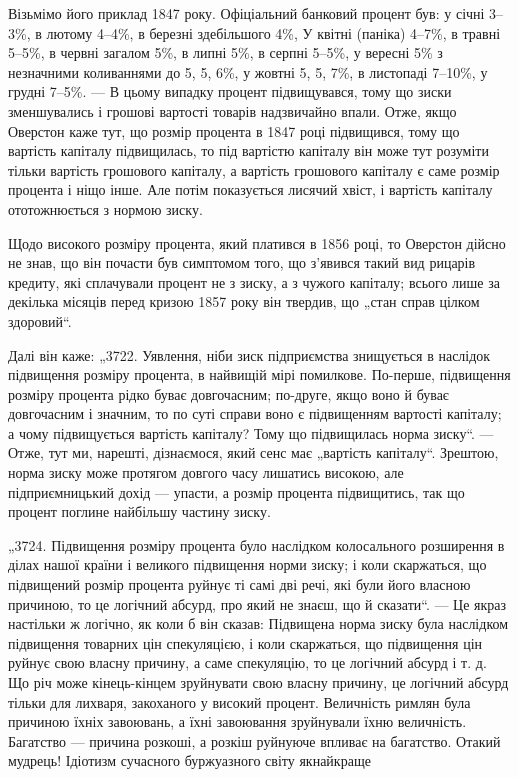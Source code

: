 Візьмімо його приклад 1847 року. Офіціальний банковий процент був: у січні 3--3\%,
в лютому 4--4\%, в березні здебільшого 4\%, У квітні (паніка) 4--7\%, в травні 5--5\%, в червні загалом 5\%,
в липні 5\%, в серпні 5--5\%, у вересні 5\% з незначними
коливаннями до 5, 5, 6\%, у жовтні 5, 5, 7\%, в листопаді 7--10\%, у грудні 7--5\%. — В цьому
випадку процент підвищувався,
тому що зиски зменшувались і грошові вартості товарів надзвичайно впали. Отже, якщо Оверстон каже
тут, що розмір процента
в 1847 році підвищився, тому що вартість капіталу підвищилась,
то під вартістю капіталу він може тут розуміти тільки вартість
грошового капіталу, а вартість грошового капіталу є саме розмір
процента і ніщо інше. Але потім показується лисячий хвіст,
і вартість капіталу ототожнюється з нормою зиску.

Щодо високого розміру процента, який платився в 1856 році,
то Оверстон дійсно не знав, що він почасти був симптомом того,
що з’явився такий вид рицарів кредиту, які сплачували процент
не з зиску, а з чужого капіталу; всього лише за декілька місяців
перед кризою 1857 року він твердив, що „стан справ цілком
здоровий“.

Далі він каже: „3722. Уявлення, ніби зиск підприємства знищується в наслідок підвищення розміру
процента, в найвищій
мірі помилкове. По-перше, підвищення розміру процента рідко
буває довгочасним; по-друге, якщо воно й буває довгочасним
і значним, то по суті справи воно є підвищенням вартості капіталу; а чому підвищується вартість
капіталу? Тому що підвищилась норма зиску“. — Отже, тут ми, нарешті, дізнаємося,
який сенс має „вартість капіталу“. Зрештою, норма зиску може
протягом довгого часу лишатись високою, але підприємницький
дохід — упасти, а розмір процента підвищитись, так що процент поглине найбільшу частину зиску.

„3724. Підвищення розміру процента було наслідком колосального
розширення в ділах нашої країни і великого підвищення норми зиску; і коли скаржаться, що підвищений
розмір
процента руйнує ті самі дві речі, які були його власною причиною, то це логічний абсурд, про який не
знаєш, що й сказати“. — Це якраз настільки ж логічно, як коли б він сказав:
Підвищена норма зиску була наслідком підвищення товарних
цін спекуляцією, і коли скаржаться, що підвищення цін руйнує
свою власну причину, а саме спекуляцію, то це логічний абсурд
і т. д. Що річ може кінець-кінцем зруйнувати свою власну причину, це логічний абсурд тільки для
лихваря, закоханого у високий процент. Величність римлян була причиною їхніх завоювань,
а їхні завоювання зруйнували їхню величність. Багатство — причина
розкоші, а розкіш руйнуюче впливає на багатство. Отакий
мудрець! Ідіотизм сучасного буржуазного світу якнайкраще
\parbreak{}  %
